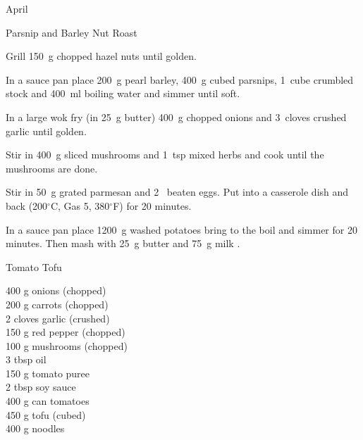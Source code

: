 \begin{menu}{April}
\begin{recipe}{2}{Parsnip and Barley Nut Roast}
    \begin{instructions}
    \item 
        Grill 150~g chopped hazel nuts until golden.
      \item 
        In a sauce pan
        place
        200~g  pearl barley,
        400~g cubed parsnips,
        1~cube crumbled stock
        and
        400~ml  boiling water
        and simmer until soft.
      \item 
        In a large wok fry
        (in 25~g  butter)
        400~g chopped onions
        and
        3~cloves crushed garlic
        until golden.
      \item 
        Stir in
        400~g sliced mushrooms
        and
        1~tsp  mixed herbs
        and cook until the mushrooms are done.
      \item 
        Stir in
        50~g grated parmesan
        and
        2~ beaten eggs.
        Put into a
        casserole dish
        and back
        (200$^{\circ}$C, Gas 5, 380$^{\circ}$F)
        for 20 minutes.      
      \item 
      In a sauce pan place
      1200~g washed potatoes
      bring to the boil and simmer for 20 minutes.
      Then mash with 
      25~g  butter 
      and
      75~g  milk .
  
    \end{instructions}
    \end{recipe}%
  
    \begin{recipe}{2}{Tomato Tofu}%
		\begin{ingredients}
		400 g onions (chopped) \\
	200 g carrots (chopped) \\
	2 cloves garlic (crushed) \\
	150 g red pepper (chopped) \\
	100 g mushrooms (chopped) \\
	3 tbsp oil  \\
	150 g tomato puree  \\
	2 tbsp soy sauce  \\
	400 g can tomatoes  \\
	450 g tofu (cubed) \\
	400 g noodles  \\
	
		\end{ingredients}
	

\end{recipe}
\end{menu}
